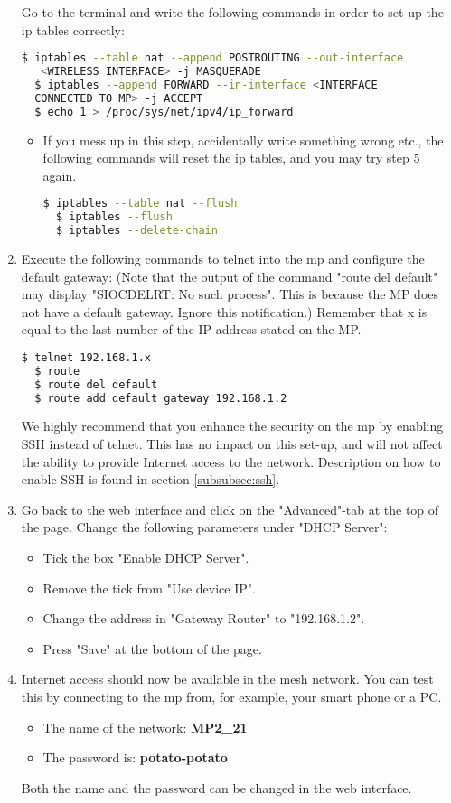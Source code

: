 \begin{enumerate}
Go to the terminal and write the following commands in order to set up the ip tables correctly:
\noindent
\begin{lstlisting}[language=bash]
  $ iptables --table nat --append POSTROUTING --out-interface
   <WIRELESS INTERFACE> -j MASQUERADE
  $ iptables --append FORWARD --in-interface <INTERFACE 
  CONNECTED TO MP> -j ACCEPT
  $ echo 1 > /proc/sys/net/ipv4/ip_forward
\end{lstlisting} 
\begin{itemize}
\item If you mess up in this step, accidentally write something wrong etc., the following commands will reset the ip tables, and you may try step 5 again.
\noindent
\begin{lstlisting}[language=bash]
  $ iptables --table nat --flush
  $ iptables --flush
  $ iptables --delete-chain
\end{lstlisting}
\end{itemize}  

\item Execute the following commands to telnet into the \gls{mp} and configure the default gateway: (Note that the output of the command "route del default" may display "SIOCDELRT: No such process". This is because the MP does not have a default gateway. Ignore this notification.) Remember that x is equal to the last number of the IP address stated on the MP.
\begin{lstlisting}[language=bash]
  $ telnet 192.168.1.x
  $ route 
  $ route del default 
  $ route add default gateway 192.168.1.2
\end{lstlisting} 

We highly recommend that you enhance the security on the \gls{mp} by enabling SSH instead of telnet. This has no impact on this set-up, and will not affect the ability to provide Internet access to the network. Description on how to enable SSH is found in section \ref{subsubsec:ssh}.

\item Go back to the web interface and click on the "Advanced"-tab at the top of the page. Change the following parameters under "DHCP Server":
\begin{itemize}
\item Tick the box "Enable DHCP Server".
\item Remove the tick from "Use device IP".
\item Change the address in "Gateway Router" to "192.168.1.2".
\item Press "Save" at the bottom of the page. 
\end{itemize}

\item Internet access should now be available in the mesh network. You can test this by connecting to the \gls{mp} from, for example, your smart phone or a PC. 
\begin{itemize}
\item The name of the network: \textbf{MP2_21}
\item The password is: \textbf{potato-potato}
\end{itemize}
Both the name and the password can be changed in the web interface. 
\end{enumerate}
